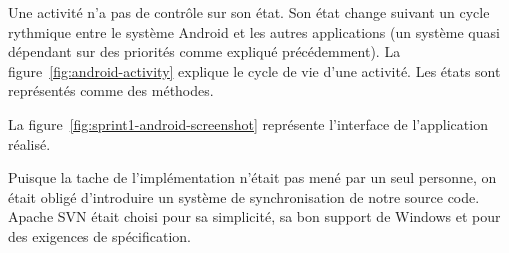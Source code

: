 Une activité n'a pas de contrôle sur son état. Son état change suivant un cycle
rythmique entre le système Android et les autres applications (un système quasi
dépendant sur des priorités comme expliqué précédemment). La
figure~\ref{fig:android-activity} explique le cycle de vie d'une activité. Les
états sont représentés comme des méthodes.



%

La figure~\ref{fig:sprint1-android-screenshot} représente l'interface de
l'application réalisé.

Puisque la tache de l'implémentation n'était pas mené par un seul personne, on
était obligé d'introduire un système de synchronisation de notre source code.
Apache SVN était choisi pour sa simplicité, sa bon support de Windows et pour
des exigences de spécification.


